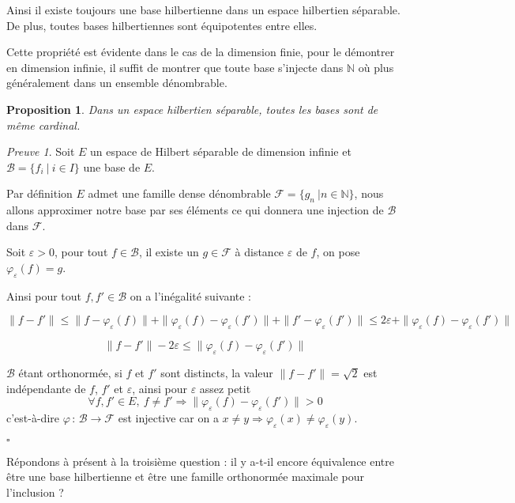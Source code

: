 \documentclass[]{article}
\newtheorem{myproposition}{Proposition}
\theoremstyle{remark}
\newtheorem{myproof}{Preuve}
\theoremstyle{definition}
\newcommand{\cqfd}{
	\hfill$\square$
}
\newcommand{\funcshort}[3]{
	#1 \, : \, #2 \longrightarrow #3
}
\begin{document}
	Ainsi il existe toujours une base hilbertienne dans un espace hilbertien séparable. De plus, toutes bases hilbertiennes sont équipotentes entre elles.
	
	Cette propriété est évidente dans le cas de la dimension finie, pour le démontrer en dimension infinie, il suffit de montrer que toute base s'injecte dans $\mathbb{N}$ où plus généralement dans un ensemble dénombrable.
	
	\begin{myproposition}
		Dans un espace hilbertien séparable, toutes les bases sont de même cardinal.
	\end{myproposition}
	
	\begin{myproof}
		Soit $E$ un espace de Hilbert séparable de dimension infinie et $\mathcal{B} = \{f_i ~ | ~ i \in I\}$ une base de $E$.
		
		Par définition $E$ admet une famille dense dénombrable $\mathcal{F} = \{g_n ~ | n \in \mathbb{N}\}$, nous allons approximer notre base par ses éléments ce qui donnera une injection de $\mathcal{B}$ dans $\mathcal{F}$.
		
		Soit $\varepsilon > 0$, pour tout $f \in \mathcal{B}$, il existe un $g \in \mathcal{F}$ à distance $\varepsilon$ de $f$, on pose $\varphi_\varepsilon(f) = g$.
		
		Ainsi pour tout $f, f' \in \mathcal{B}$ on a l'inégalité suivante :
		
		$$\|f - f'\| \leqslant \|f - \varphi_\varepsilon(f)\| + \|\varphi_\varepsilon(f) - \varphi_\varepsilon(f')\| + \|f' - \varphi_\varepsilon(f')\| \leqslant 2 \varepsilon + \|\varphi_\varepsilon(f) - \varphi_\varepsilon(f')\|$$
		
		$$\|f - f'\| - 2 \varepsilon \leqslant \|\varphi_\varepsilon(f) - \varphi_\varepsilon(f')\|$$
		
		$\mathcal{B}$ étant orthonormée, si $f$ et $f'$ sont distincts, la valeur $\|f-f'\| = \sqrt{2}$ est indépendante de $f$, $f'$ et $\varepsilon$, ainsi pour $\varepsilon$ assez petit $$\forall f, f' \in E, ~ f \neq f' \Longrightarrow \|\varphi_\varepsilon(f) - \varphi_\varepsilon(f')\| > 0$$ c'est-à-dire $\funcshort{\varphi}{\mathcal{B}}{\mathcal{F}}$ est injective car on a $x \neq y \Longrightarrow \varphi_\varepsilon(x) \neq \varphi_\varepsilon(y)$.
		
		\cqfd
	\end{myproof}
	
	Répondons à présent à la troisième question : il y a-t-il encore équivalence entre être une base hilbertienne et être une famille orthonormée maximale pour l'inclusion ?
	
\end{document}
